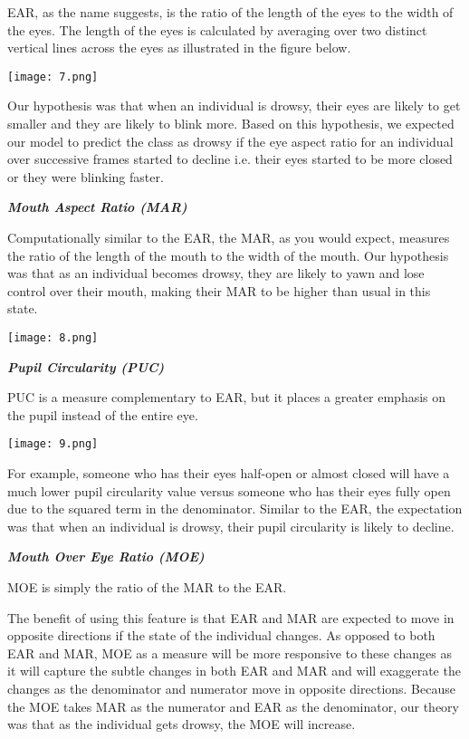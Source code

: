 \documentclass[a4paper,12pt]{article}
\begin{document}
EAR, as the name suggests, is the ratio of the length of the eyes to the
width of the eyes. The length of the eyes is calculated by averaging
over two distinct vertical lines across the eyes as illustrated in the
figure below.

\texttt{[image: 7.png]}

Our hypothesis was that when an individual is drowsy, their eyes are
likely to get smaller and they are likely to blink more. Based on this
hypothesis, we expected our model to predict the class as drowsy if the
eye aspect ratio for an individual over successive frames started to
decline i.e. their eyes started to be more closed or they were blinking
faster.

\emph{\textbf{Mouth Aspect Ratio (MAR)}}

Computationally similar to the EAR, the MAR, as you would expect,
measures the ratio of the length of the mouth to the width of the mouth.
Our hypothesis was that as an individual becomes drowsy, they are likely
to yawn and lose control over their mouth, making their MAR to be higher
than usual in this state.

\texttt{[image: 8.png]}

\emph{\textbf{Pupil Circularity (PUC)}}

PUC is a measure complementary to EAR, but it places a greater emphasis
on the pupil instead of the entire eye.

\texttt{[image: 9.png]}

For example, someone who has their eyes half-open or almost closed will
have a much lower pupil circularity value versus someone who has their
eyes fully open due to the squared term in the denominator. Similar to
the EAR, the expectation was that when an individual is drowsy, their
pupil circularity is likely to decline.

\emph{\textbf{Mouth Over Eye Ratio (MOE)}}

MOE is simply the ratio of the MAR to the EAR.

The benefit of using this feature is that EAR and MAR are expected to
move in opposite directions if the state of the individual changes. As
opposed to both EAR and MAR, MOE as a measure will be more responsive to
these changes as it will capture the subtle changes in both EAR and MAR
and will exaggerate the changes as the denominator and numerator move in
opposite directions. Because the MOE takes MAR as the numerator and EAR
as the denominator, our theory was that as the individual gets drowsy,
the MOE will increase.
\end{document}
